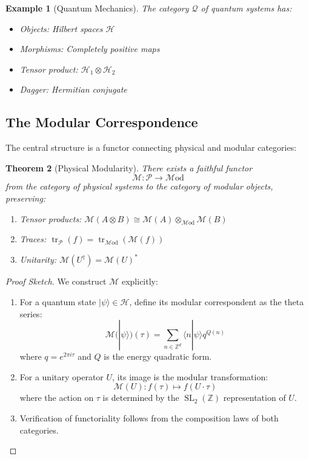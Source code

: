 \documentclass[12pt,a4paper]{article}
\newtheorem{theorem}{Theorem}[section]
\newtheorem{example}[theorem]{Example}
\DeclareMathOperator{\SL}{SL}
\DeclareMathOperator{\tr}{tr}
\begin{document}
\begin{example}[Quantum Mechanics]
The category $\mathcal{Q}$ of quantum systems has:
\begin{itemize}
\item Objects: Hilbert spaces $\mathcal{H}$
\item Morphisms: Completely positive maps
\item Tensor product: $\mathcal{H}_1 \otimes \mathcal{H}_2$
\item Dagger: Hermitian conjugate
\end{itemize}
\end{example}

\subsection{The Modular Correspondence}

The central structure is a functor connecting physical and modular categories:

\begin{theorem}[Physical Modularity]
There exists a faithful functor
\[
\mathcal{M}: \mathcal{P} \to \mathcal{M}\text{od}
\]
from the category of physical systems to the category of modular objects, preserving:
\begin{enumerate}
\item Tensor products: $\mathcal{M}(A \otimes B) \cong \mathcal{M}(A) \otimes_{\mathcal{M}\text{od}} \mathcal{M}(B)$
\item Traces: $\tr_\mathcal{P}(f) = \tr_{\mathcal{M}\text{od}}(\mathcal{M}(f))$
\item Unitarity: $\mathcal{M}(U^\dagger) = \mathcal{M}(U)^*$
\end{enumerate}
\end{theorem}

\begin{proof}[Proof Sketch]
We construct $\mathcal{M}$ explicitly:
\begin{enumerate}
\item For a quantum state $|\psi\rangle \in \mathcal{H}$, define its modular correspondent as the theta series:
\[
\mathcal{M}(|\psi\rangle)(\tau) = \sum_{n \in \mathbb{Z}^d} \langle n|\psi\rangle q^{Q(n)}
\]
where $q = e^{2\pi i \tau}$ and $Q$ is the energy quadratic form.

\item For a unitary operator $U$, its image is the modular transformation:
\[
\mathcal{M}(U): f(\tau) \mapsto f(U \cdot \tau)
\]
where the action on $\tau$ is determined by the $\SL_2(\mathbb{Z})$ representation of $U$.

\item Verification of functoriality follows from the composition laws of both categories.
\end{enumerate}
\end{proof}
\end{document}
